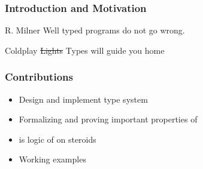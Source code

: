 \begin{frame}[c]
  \frametitle{Introduction and Motivation}
  \begin{center}
    \uncover<+-> {\LARGE
      \begin{aquote}{R. Milner}
        Well typed programs do not go wrong.
      \end{aquote}
    }
    \vspace{2cm}
    \uncover<+-> {\LARGE
      \begin{aquote}{Coldplay}
        \sout{Lights}{\color{red} Types} will guide you home
      \end{aquote}
    }
  \end{center}
\end{frame}

\begin{frame}
  \frametitle{Contributions}
  \begin{itemize}
  \item
    Design and implement \qub{} type system
  \item Formalizing and proving important properties of \qub{}
  \item \qub{} is logic of \BI on steroids
  \item {\color{red}Working examples}
  \end{itemize}
\end{frame}

